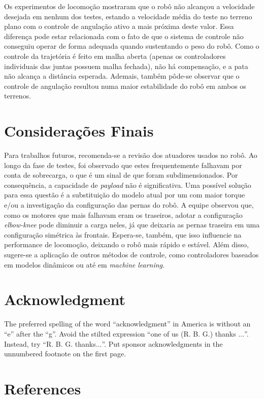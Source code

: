 \documentclass[conference]{IEEEtran}
\begin{document}
Os experimentos de locomoção mostraram que o robô não alcançou a velocidade desejada em nenhum dos testes, estando  a velocidade média do teste no terreno plano com o controle de angulação ativo a mais próxima deste valor. Essa diferença pode estar relacionada com o fato de que o sistema de controle não conseguiu operar de forma adequada quando sustentando o peso do robô. Como o controle da trajetória é feito em malha aberta (apenas os controladores individuais das juntas possuem malha fechada), não há compensação, e a pata não alcança a distância esperada. Ademais, também pôde-se observar que o controle de angulação resultou numa maior estabilidade do robô em ambos os terrenos.

\section{Considerações Finais}

Para trabalhos futuros, recomenda-se a revisão dos atuadores usados no robô. Ao longo da fase de testes, foi observado que estes frequentemente falhavam por conta de sobrecarga, o que é um sinal de que foram subdimensionados. Por consequência, a capacidade de \textit{payload} não é significativa. Uma possível solução para essa questão é a substituição do modelo atual por um com maior torque e/ou a investigação da configuração das pernas do robô. A equipe observou que, como os motores que mais falhavam eram os traseiros, adotar a configuração \textit{elbow-knee} pode diminuir a carga neles, já que deixaria as pernas traseira em uma configuração simétrica às frontais. Espera-se, também, que isso influencie na performance de locomoção, deixando o robô mais rápido e estável. Além disso, sugere-se a aplicação de outros métodos de controle, como controladores baseados em modelos dinâmicos ou até em \textit{machine learning}.


\section*{Acknowledgment}

The preferred spelling of the word ``acknowledgment'' in America is without
an ``e'' after the ``g''. Avoid the stilted expression ``one of us (R. B.
G.) thanks $\ldots$''. Instead, try ``R. B. G. thanks$\ldots$''. Put sponsor
acknowledgments in the unnumbered footnote on the first page.

\section*{References}
\end{document}
